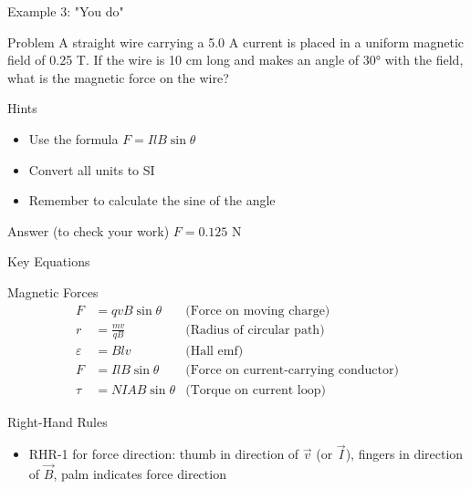 \documentclass{beamer}
\begin{document}
\begin{frame}{Example 3: "You do"}
\begin{block}{Problem}
A straight wire carrying a 5.0 A current is placed in a uniform magnetic field of 0.25 T. If the wire is 10 cm long and makes an angle of 30° with the field, what is the magnetic force on the wire?
\end{block}
\pause
\begin{block}{Hints}
\begin{itemize}
\item Use the formula $F = IlB\sin\theta$
\item Convert all units to SI
\item Remember to calculate the sine of the angle
\end{itemize}
\end{block}
\pause
\begin{block}{Answer (to check your work)}
$F = 0.125$ N
\end{block}
\end{frame}

\begin{frame}{Key Equations}
\begin{block}{Magnetic Forces}
\begin{align}
F &= qvB\sin\theta & \text{(Force on moving charge)} \\
r &= \frac{mv}{qB} & \text{(Radius of circular path)} \\
\varepsilon &= Blv & \text{(Hall emf)} \\
F &= IlB\sin\theta & \text{(Force on current-carrying conductor)} \\
\tau &= NIAB\sin\theta & \text{(Torque on current loop)}
\end{align}
\end{block}

\begin{block}{Right-Hand Rules}
\begin{itemize}
\item RHR-1 for force direction: thumb in direction of $\vec{v}$ (or $\vec{I}$), fingers in direction of $\vec{B}$, palm indicates force direction
\end{itemize}
\end{block}
\end{frame}
\end{document}

